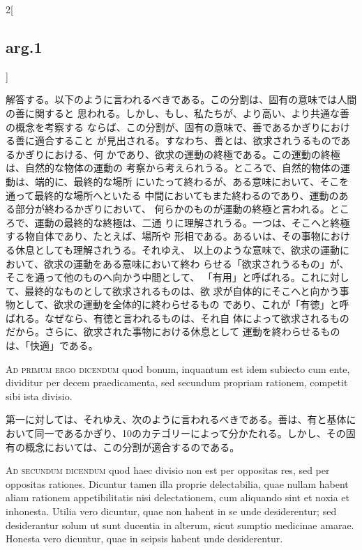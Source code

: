 \documentclass[paper=a4paper,fontsize=10pt,jafontsize=9pt,titlepage]{jlreq}
\begin{document}
\begin{paracol}{2}[\subsection{arg.1}]
\switchcolumn

解答する。以下のように言われるべきである。この分割は、固有の意味では人間の善に関すると
 思われる。しかし、もし、私たちが、より高い、より共通な善の概念を考察する
 ならば、この分割が、固有の意味で、善であるかぎりにおける善に適合すること
 が見出される。すなわち、善とは、欲求されうるものであるかぎりにおける、何
 かであり、欲求の運動の終極である。この運動の終極は、自然的な物体の運動の
 考察から考えられうる。ところで、自然的物体の運動は、端的に、最終的な場所
 にいたって終わるが、ある意味において、そこを通って最終的な場所へといたる
 中間においてもまた終わるのであり、運動のある部分が終わるかぎりにおいて、
 何らかのものが運動の終極と言われる。ところで、運動の最終的な終極は、二通
 りに理解されうる。一つは、そこへと終極する物自体であり、たとえば、場所や
 形相である。あるいは、その事物における休息としても理解されうる。それゆえ、
 以上のような意味で、欲求の運動において、欲求の運動をある意味において終わ
 らせる「欲求されうるもの」が、そこを通って他のものへ向かう中間として、
 「有用」と呼ばれる。これに対して、最終的なものとして欲求されるものは、欲
 求が自体的にそこへと向かう事物として、欲求の運動を全体的に終わらせるもの
 であり、これが「有徳」と呼ばれる。なぜなら、有徳と言われるものは、それ自
 体によって欲求されるものだから。さらに、欲求された事物における休息として
 運動を終わらせるものは、「快適」である。

\switchcolumn*[\subsection{ad.1}]

{\scshape Ad primum ergo dicendum} quod bonum, inquantum est idem subiecto cum
 ente, dividitur per decem praedicamenta, sed secundum propriam
 rationem, competit sibi ista divisio.

\switchcolumn

第一に対しては、それゆえ、次のように言われるべきである。善は、有と基体において同一であるかぎり、10のカテゴリーによって分かたれる。しかし、その固有の概念においては、この分割が適合するのである。

\switchcolumn*[\subsection{ad.2}]

{\scshape Ad secundum dicendum} quod haec divisio non est per oppositas res,
 sed per oppositas rationes. Dicuntur tamen illa proprie delectabilia,
 quae nullam habent aliam rationem appetibilitatis nisi delectationem,
 cum aliquando sint et noxia et inhonesta. Utilia vero dicuntur, quae
 non habent in se unde desiderentur; sed desiderantur solum ut sunt
 ducentia in alterum, sicut sumptio medicinae amarae. Honesta vero
 dicuntur, quae in seipsis habent unde desiderentur.


\end{paracol}
\end{document}
